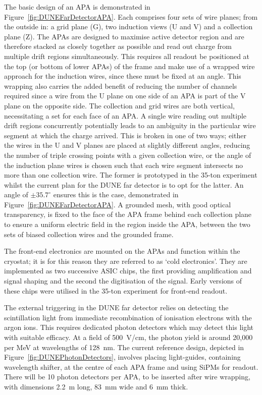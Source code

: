 The basic design of an APA is demonstrated in Figure~\ref{fig:DUNEFarDetectorAPA}.  Each comprises four sets of wire planes; from the outside in: a grid plane (G), two induction views (U and V) and a collection plane (Z).  The APAs are designed to maximise active detector region and are therefore stacked as closely together as possible and read out charge from multiple drift regions simultaneously.  This requires all readout be positioned at the top (or bottom of lower APAs) of the frame and make use of a wrapped wire approach for the induction wires, since these must be fixed at an angle.  This wrapping also carries the added benefit of reducing the number of channels required since a wire from the U plane on one side of an APA is part of the V plane on the opposite side.  The collection and grid wires are both vertical, necessitating a set for each face of an APA.  A single wire reading out multiple drift regions concurrently potentially leads to an ambiguity in the particular wire segment at which the charge arrived.  This is broken in one of two ways; either the wires in the U and V planes are placed at slightly different angles, reducing the number of triple crossing points with a given collection wire, or the angle of the induction plane wires is chosen such that each wire segment intersects no more than one collection wire.  The former is prototyped in the 35-ton experiment whilst the current plan for the DUNE far detector is to opt for the latter.  An angle of $\pm35.7^{\circ}$ ensures this is the case, demonstrated in Figure~\ref{fig:DUNEFarDetectorAPA}.  A grounded mesh, with good optical transparency, is fixed to the face of the APA frame behind each collection plane to ensure a uniform electric field in the region inside the APA, between the two sets of biased collection wires and the grounded frame.

The front-end electronics are mounted on the APAs and function within the cryostat; it is for this reason they are referred to as `cold electronics'.  They are implemented as two successive ASIC chips, the first providing amplification and signal shaping and the second the digitisation of the signal.  Early versions of these chips were utilised in the 35-ton experiment for front-end readout.

The external triggering in the DUNE far detector relies on detecting the scintillation light from immediate recombination of ionisation electrons with the argon ions.  This requires dedicated photon detectors which may detect this light with suitable efficacy.  At a field of 500~V/cm, the photon yield is around 20,000 per MeV at wavelengths of 128~nm.  The current reference design, depicted in Figure~\ref{fig:DUNEPhotonDetectors}, involves placing light-guides, containing wavelength shifter, at the centre of each APA frame and using SiPMs for readout.  There will be 10 photon detectors per APA, to be inserted after wire wrapping, with dimensions 2.2~m long, 83~mm wide and 6~mm thick.

